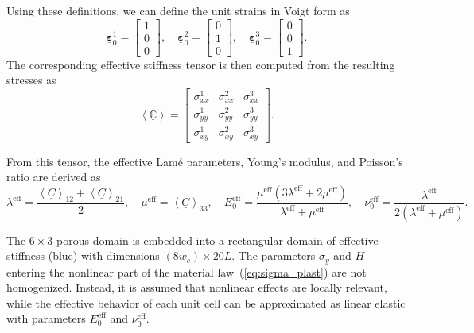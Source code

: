 \documentclass[pdflatex,sn-mathphys-num]{sn-jnl}%
\theoremstyle{thmstyleone}%
\theoremstyle{thmstyletwo}%
\theoremstyle{thmstylethree}%
\begin{document}
Using these definitions, we can define the unit strains in Voigt form as
\begin{equation}
\underline{\boldsymbol{\varepsilon}}_0^1 =
\begin{bmatrix} 1 \\ 0 \\ 0 \end{bmatrix}, \quad
\underline{\boldsymbol{\varepsilon}}_0^2 =
\begin{bmatrix} 0 \\ 1 \\ 0 \end{bmatrix}, \quad
\underline{\boldsymbol{\varepsilon}}_0^3 =
\begin{bmatrix} 0 \\ 0 \\ 1 \end{bmatrix}.
\end{equation}
The corresponding effective stiffness tensor is then computed from the resulting stresses as
\begin{equation}
    \left< \underline{\boldsymbol{\mathbb{C}}} \right> =
    \begin{bmatrix}
         \sigma_{xx}^1 & \sigma_{xx}^2 & \sigma_{xx}^3 \\
         \sigma_{yy}^1 & \sigma_{yy}^2 & \sigma_{yy}^3 \\
         \sigma_{xy}^1 & \sigma_{xy}^2 & \sigma_{xy}^3
     \end{bmatrix}.
\end{equation}


From this tensor, the effective Lamé parameters, Young’s modulus, and Poisson’s ratio are derived as
\begin{equation}
    \lambda^{\text{eff}} = \dfrac{\left< \underline{C} \right>_{12} + \left< \underline{C} \right>_{21}}{2}, \quad
    \mu^{\text{eff}} = \left< \underline{C} \right>_{33}, \quad
    E_0^{\text{eff}} = \dfrac{\mu^{\text{eff}} (3 \lambda^{\text{eff}} + 2 \mu^{\text{eff}})}{\lambda^{\text{eff}} + \mu^{\text{eff}}}, \quad
    \nu_0^{\text{eff}} = \dfrac{\lambda^{\text{eff}}}{2 (\lambda^{\text{eff}} + \mu^{\text{eff}})}.
\end{equation}

The $6 \times 3$ porous domain is embedded into a rectangular domain of effective stiffness (blue) with dimensions $(8 w_c) \times 20 L$.  The parameters $\sigma_y$ and $H$ entering the nonlinear part of the material law~(\ref{eq:sigma_plast}) are not homogenized. 
Instead, it is assumed that nonlinear effects are locally relevant, while the effective behavior of each unit cell can be approximated as linear elastic with parameters $E_0^{\text{eff}}$ and $\nu_0^{\text{eff}}$. 
\end{document}
